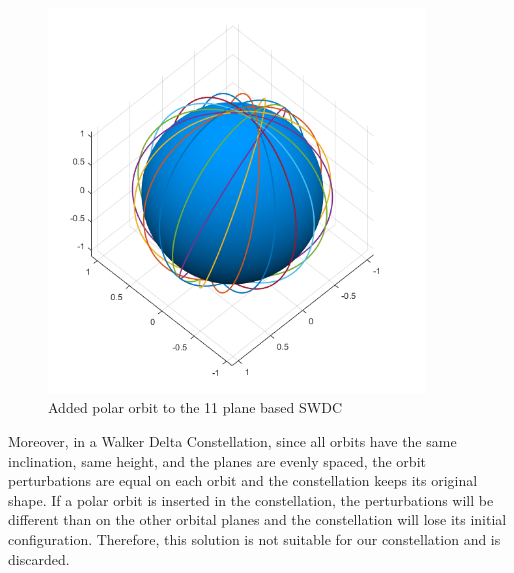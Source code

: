\begin{figure}[h]
\includegraphics[width=10cm]{semiwalker11p1}
\centering
\caption{Added polar orbit to the 11 plane based SWDC}
\end{figure}

Moreover, in a Walker Delta Constellation, since all orbits have the same inclination, same height, and the planes are evenly spaced, the orbit perturbations are equal on each orbit and the constellation keeps its original shape. If a polar orbit is inserted in the constellation, the perturbations will be different than on the other orbital planes and the constellation will lose its initial configuration. Therefore, this solution is not suitable for our constellation and is discarded.